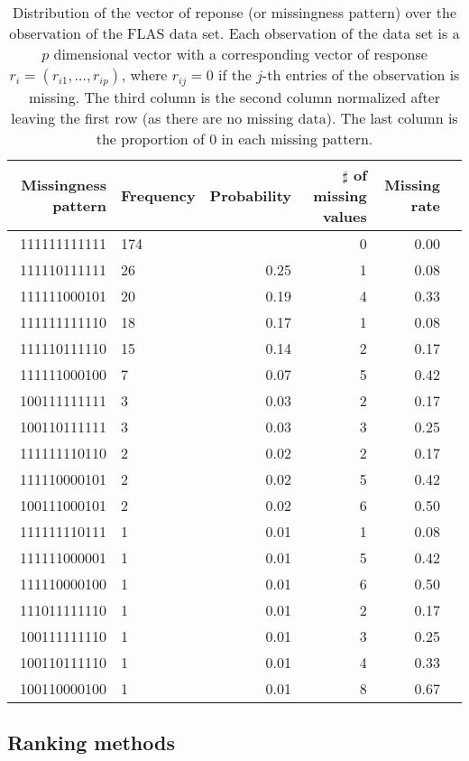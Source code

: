\begin{table}[ht]
\centering
\begin{tabular}{rlrrrr}
  \hline
  Missingness pattern & Frequency & Probability & $\sharp$ of missing values & Missing rate \\
  \hline
  111111111111 & 174 &      &   0 & 0.00 \\
  111110111111 &  26 & 0.25 &   1 & 0.08 \\
  111111000101 &  20 & 0.19 &   4 & 0.33 \\
  111111111110 &  18 & 0.17 &   1 & 0.08 \\
  111110111110 &  15 & 0.14 &   2 & 0.17 \\
  111111000100 &   7 & 0.07 &   5 & 0.42 \\
  100111111111 &   3 & 0.03 &   2 & 0.17 \\
  100110111111 &   3 & 0.03 &   3 & 0.25 \\
  111111110110 &   2 & 0.02 &   2 & 0.17 \\
  111110000101 &   2 & 0.02 &   5 & 0.42 \\
  100111000101 &   2 & 0.02 &   6 & 0.50 \\
  111111110111 &   1 & 0.01 &   1 & 0.08 \\
  111111000001 &   1 & 0.01 &   5 & 0.42 \\
  111110000100 &   1 & 0.01 &   6 & 0.50 \\
  111011111110 &   1 & 0.01 &   2 & 0.17 \\
  100111111110 &   1 & 0.01 &   3 & 0.25 \\
  100110111110 &   1 & 0.01 &   4 & 0.33 \\
  100110000100 &   1 & 0.01 &   8 & 0.67 \\
  \hline
\end{tabular}
\caption{
  Distribution of the vector of reponse (or missingness pattern) over the
  observation of the FLAS data set.  Each observation of the data set is a $p$
  dimensional vector with a corresponding vector of response $r_i = (r_{i1},
  \dots, r_{ip})$, where $r_{ij} = 0$ if the $j$-th entries of the observation is
  missing. The third column is the second column normalized after leaving the
  first row (as there are no missing data). The last column is the proportion
  of $0$ in each missing pattern.}
\label{tbl:flas:missingness:pattern}
\end{table}

\subsection{Ranking methods}

